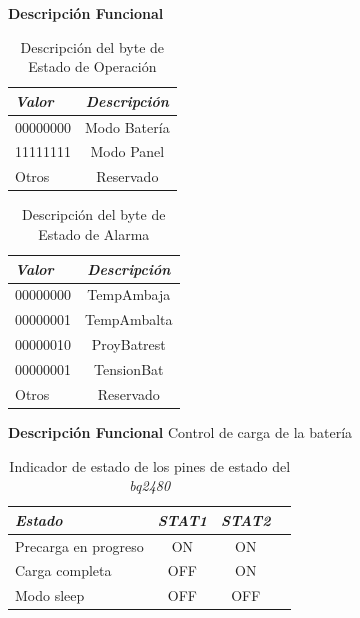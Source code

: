 \documentclass[aspectratio=43, handout]{beamer}
\begin{document}
\begin{frame}{\textbf{\LARGE{Descripción Funcional}}}
\begin{table}[ht]
	\centering
	\caption{Descripción del byte de Estado de Operación}
	\begin{tabular}{@{} l *1c @{}}    %
		\emph{\textbf{Valor}} & \emph{\textbf{Descripción}}\\
		\hline
		00000000 &  Modo Batería\\
		11111111 &  Modo Panel\\
		Otros & Reservado\\
		\hline
	\end{tabular}
	\label{tab:edoope}
\end{table}

\fontsize{13pt}{13}\selectfont
\begin{table}[ht]
	\centering
	\caption{Descripción del byte de Estado de Alarma}
	\begin{tabular}{@{} l *1c @{}}    %
		\emph{\textbf{Valor}} & \emph{\textbf{Descripción}}\\
		\hline
		00000000 & TempAmbaja\\	
		00000001 & TempAmbalta\\
		00000010 & ProyBatrest\\
		00000001 & TensionBat\\
		Otros & Reservado\\
		\hline
	\end{tabular}
\end{table}
\end{frame}

\begin{frame}{\textbf{\LARGE{Descripción Funcional}}}
\noindent Control de carga de la batería
\begin{table}[ht]
	\centering
	\caption{Indicador de estado de los pines de estado del \textit{bq2480}}
	\begin{tabular}{@{} l *3c @{}}    %
		\emph{\textbf{Estado}} & \emph{\textbf{STAT1}} & \emph{\textbf{STAT2}}\\
		\hline
		Precarga en progreso &  ON & ON \\	
		Carga completa &  OFF & ON \\
		Modo sleep &  OFF & OFF \\
		\hline
	\end{tabular}
	\label{tab:STAT}
\end{table}
\end{frame}
\end{document}
